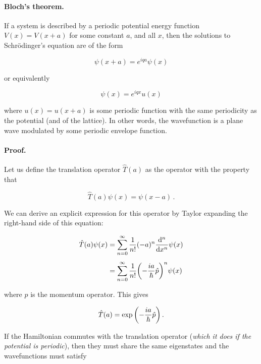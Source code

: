 \documentclass[12pt, titlepage]{article}
\begin{document}
\begin{mdframed}
\paragraph*{Bloch's theorem.}
If a system is described by a periodic potential energy function $V(x) = V(x+a)$ for some constant $a$, and all $x$, then the solutions to Schrödinger's equation are of the form

\begin{equation}
	\psi(x+a) = e^{iqa}\psi(x) 
\end{equation}

or equivalently

\begin{equation}
	\psi(x) = e^{iqx}u(x)
\end{equation}

where $u(x) = u(x+a)$ is some periodic function with the same periodicity as the potential (and of the lattice). In other words, the wavefunction is a plane wave modulated by some periodic envelope function.

\paragraph*{Proof.}
Let us define the translation operator $\hat{T}(a)$ as the operator with the property that 

\begin{equation}
	\hat{T}(a)\psi(x) = \psi(x-a) \,.
\end{equation} 

We can derive an explicit expression for this operator by Taylor expanding the right-hand side of this equation:

\begin{align*}
	\hat{T}(a)\psi(x) &= \sum_{n=0}^{\infty}\frac{1}{n!}(-a)^n\dv[n]{x}\psi(x) \\[4pt]
	&= \sum_{n=0}^{\infty}\frac{1}{n!}\qty(-\frac{ia}{\hbar}\hat{p})^n\psi(x)
\end{align*}

where $\hat{p}$ is the momentum operator. This gives

\begin{equation}
	\hat{T}(a) = \exp\qty(-\frac{ia}{\hbar}\hat{p}) \,.
\end{equation}

If the Hamiltonian commutes with the translation operator (\textit{which it does if the potential is periodic}), then they must share the same eigenstates and the wavefunctions must satisfy


\end{mdframed}
\end{document}
